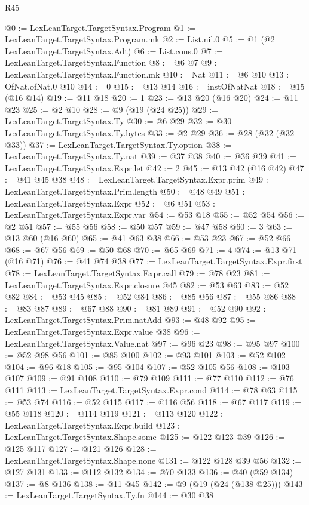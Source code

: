 \begin{lexlean}{R45}
\begin{coremodule}
{{{{{{{{{@0 := LexLeanTarget.TargetSyntax.Program
@1 := LexLeanTarget.TargetSyntax.Program.mk
@2 := List.nil.{0}
@5 := @1 (@2 LexLeanTarget.TargetSyntax.Adt)
@6 := List.cons.{0}
@7 := LexLeanTarget.TargetSyntax.Function
@8 := @6 @7
@9 := LexLeanTarget.TargetSyntax.Function.mk
@10 := Nat
@11 := @6 @10
@13 := OfNat.ofNat.{0} @10
@14 := 0
@15 := @13 @14
@16 := instOfNatNat
@18 := @15 (@16 @14)
@19 := @11 @18
@20 := 1
@23 := @13 @20 (@16 @20)
@24 := @11 @23
@25 := @2 @10
@28 := @9 (@19 (@24 @25))
@29 := LexLeanTarget.TargetSyntax.Ty
@30 := @6 @29
@32 := @30 LexLeanTarget.TargetSyntax.Ty.bytes
@33 := @2 @29
@36 := @28 (@32 (@32 @33))
@37 := LexLeanTarget.TargetSyntax.Ty.option
@38 := LexLeanTarget.TargetSyntax.Ty.nat
@39 := @37 @38
@40 := @36 @39
@41 := LexLeanTarget.TargetSyntax.Expr.let
@42 := 2
@45 := @13 @42 (@16 @42)
@47 := @41 @45 @38
@48 := LexLeanTarget.TargetSyntax.Expr.prim
@49 := LexLeanTarget.TargetSyntax.Prim.length
@50 := @48 @49
@51 := LexLeanTarget.TargetSyntax.Expr
@52 := @6 @51
@53 := LexLeanTarget.TargetSyntax.Expr.var
@54 := @53 @18
@55 := @52 @54
@56 := @2 @51
@57 := @55 @56
@58 := @50 @57
@59 := @47 @58
@60 := 3
@63 := @13 @60 (@16 @60)
@65 := @41 @63 @38
@66 := @53 @23
@67 := @52 @66
@68 := @67 @56
@69 := @50 @68
@70 := @65 @69
@71 := 4
@74 := @13 @71 (@16 @71)
@76 := @41 @74 @38
@77 := LexLeanTarget.TargetSyntax.Expr.first
@78 := LexLeanTarget.TargetSyntax.Expr.call
@79 := @78 @23
@81 := LexLeanTarget.TargetSyntax.Expr.closure @45
@82 := @53 @63
@83 := @52 @82
@84 := @53 @45
@85 := @52 @84
@86 := @85 @56
@87 := @55 @86
@88 := @83 @87
@89 := @67 @88
@90 := @81 @89
@91 := @52 @90
@92 := LexLeanTarget.TargetSyntax.Prim.natAdd
@93 := @48 @92
@95 := LexLeanTarget.TargetSyntax.Expr.value @38
@96 := LexLeanTarget.TargetSyntax.Value.nat
@97 := @96 @23
@98 := @95 @97
@100 := @52 @98 @56
@101 := @85 @100
@102 := @93 @101
@103 := @52 @102
@104 := @96 @18
@105 := @95 @104
@107 := @52 @105 @56
@108 := @103 @107
@109 := @91 @108
@110 := @79 @109
@111 := @77 @110
@112 := @76 @111
@113 := LexLeanTarget.TargetSyntax.Expr.cond
@114 := @78 @63
@115 := @53 @74
@116 := @52 @115
@117 := @116 @56
@118 := @67 @117
@119 := @55 @118
@120 := @114 @119
@121 := @113 @120
@122 := LexLeanTarget.TargetSyntax.Expr.build
@123 := LexLeanTarget.TargetSyntax.Shape.some
@125 := @122 @123 @39
@126 := @125 @117
@127 := @121 @126
@128 := LexLeanTarget.TargetSyntax.Shape.none
@131 := @122 @128 @39 @56
@132 := @127 @131
@133 := @112 @132
@134 := @70 @133
@136 := @40 (@59 @134)
@137 := @8 @136
@138 := @11 @45
@142 := @9 (@19 (@24 (@138 @25)))
@143 := LexLeanTarget.TargetSyntax.Ty.fn
@144 := @30 @38
}}}}}}}}}
\end{coremodule}
\end{lexlean}
